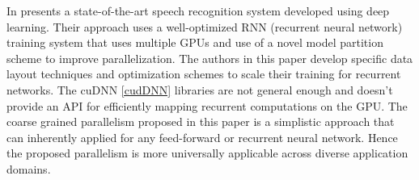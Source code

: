 In \cite{Hannun2014} presents a state-of-the-art speech recognition system developed using deep learning.
Their approach uses a well-optimized RNN (recurrent neural network) training system that uses multiple GPUs and use of a novel model partition
scheme to improve parallelization. The authors in this paper develop specific data layout techniques and optimization schemes to scale their training for recurrent networks. The cuDNN \ref{cudDNN} libraries are not general enough and doesn't provide an API for efficiently mapping recurrent computations on the GPU. The coarse grained parallelism proposed in this paper is a simplistic approach that can inherently applied for any feed-forward or recurrent neural network. Hence the proposed parallelism is more universally applicable across diverse application domains.

